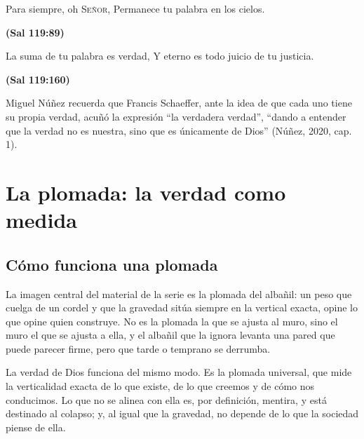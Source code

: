 \documentclass[11pt,letterpaper]{article}
\newcommand{\SENOR}{\textsc{Señor}}
\newcommand{\fuente}[1]{\par\hfill{\upshape\bfseries\small\textcolor{azul}{#1}}}
\begin{document}
\begin{cita}Para siempre, oh \SENOR{}, Permanece tu palabra en los cielos.\fuente{(Sal 119:89)}\end{cita}
\begin{cita}La suma de tu palabra es verdad, Y eterno es todo juicio de tu justicia.\fuente{(Sal 119:160)}\end{cita}

Miguel Núñez recuerda que Francis Schaeffer, ante la idea de que cada uno tiene su propia verdad, acuñó la expresión ``la verdadera verdad'', ``dando a entender que la verdad no es nuestra, sino que es únicamente de Dios'' (Núñez, 2020, cap. 1).

\section{La plomada: la verdad como medida}\label{sec:plomada}

\subsection{Cómo funciona una plomada}
La imagen central del material de la serie es la plomada del albañil: un peso que cuelga de un cordel y que la gravedad sitúa siempre en la vertical exacta, opine lo que opine quien construye. No es la plomada la que se ajusta al muro, sino el muro el que se ajusta a ella, y el albañil que la ignora levanta una pared que puede parecer firme, pero que tarde o temprano se derrumba.

La verdad de Dios funciona del mismo modo. Es la plomada universal, que mide la verticalidad exacta de lo que existe, de lo que creemos y de cómo nos conducimos. Lo que no se alinea con ella es, por definición, mentira, y está destinado al colapso; y, al igual que la gravedad, no depende de lo que la sociedad piense de ella.
\end{document}
